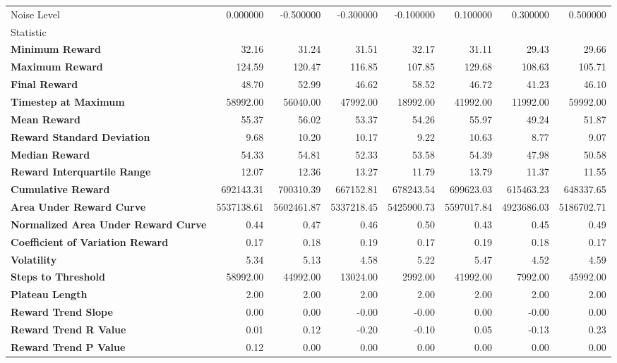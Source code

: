 \begin{tabular}{lrrrrrrr}
\toprule
Noise Level & 0.000000 & -0.500000 & -0.300000 & -0.100000 & 0.100000 & 0.300000 & 0.500000 \\
Statistic &  &  &  &  &  &  &  \\
\midrule
\textbf{Minimum Reward} & 32.16 & 31.24 & 31.51 & 32.17 & 31.11 & 29.43 & 29.66 \\
\textbf{Maximum Reward} & 124.59 & 120.47 & 116.85 & 107.85 & 129.68 & 108.63 & 105.71 \\
\textbf{Final Reward} & 48.70 & 52.99 & 46.62 & 58.52 & 46.72 & 41.23 & 46.10 \\
\textbf{Timestep at Maximum} & 58992.00 & 56040.00 & 47992.00 & 18992.00 & 41992.00 & 11992.00 & 59992.00 \\
\textbf{Mean Reward} & 55.37 & 56.02 & 53.37 & 54.26 & 55.97 & 49.24 & 51.87 \\
\textbf{Reward Standard Deviation} & 9.68 & 10.20 & 10.17 & 9.22 & 10.63 & 8.77 & 9.07 \\
\textbf{Median Reward} & 54.33 & 54.81 & 52.33 & 53.58 & 54.39 & 47.98 & 50.58 \\
\textbf{Reward Interquartile Range} & 12.07 & 12.36 & 13.27 & 11.79 & 13.79 & 11.37 & 11.55 \\
\textbf{Cumulative Reward} & 692143.31 & 700310.39 & 667152.81 & 678243.54 & 699623.03 & 615463.23 & 648337.65 \\
\textbf{Area Under Reward Curve} & 5537138.61 & 5602461.87 & 5337218.45 & 5425900.73 & 5597017.84 & 4923686.03 & 5186702.71 \\
\textbf{Normalized Area Under Reward Curve} & 0.44 & 0.47 & 0.46 & 0.50 & 0.43 & 0.45 & 0.49 \\
\textbf{Coefficient of Variation Reward} & 0.17 & 0.18 & 0.19 & 0.17 & 0.19 & 0.18 & 0.17 \\
\textbf{Volatility} & 5.34 & 5.13 & 4.58 & 5.22 & 5.47 & 4.52 & 4.59 \\
\textbf{Steps to Threshold} & 58992.00 & 44992.00 & 13024.00 & 2992.00 & 41992.00 & 7992.00 & 45992.00 \\
\textbf{Plateau Length} & 2.00 & 2.00 & 2.00 & 2.00 & 2.00 & 2.00 & 2.00 \\
\textbf{Reward Trend Slope} & 0.00 & 0.00 & -0.00 & -0.00 & 0.00 & -0.00 & 0.00 \\
\textbf{Reward Trend R Value} & 0.01 & 0.12 & -0.20 & -0.10 & 0.05 & -0.13 & 0.23 \\
\textbf{Reward Trend P Value} & 0.12 & 0.00 & 0.00 & 0.00 & 0.00 & 0.00 & 0.00 \\

\end{tabular}
